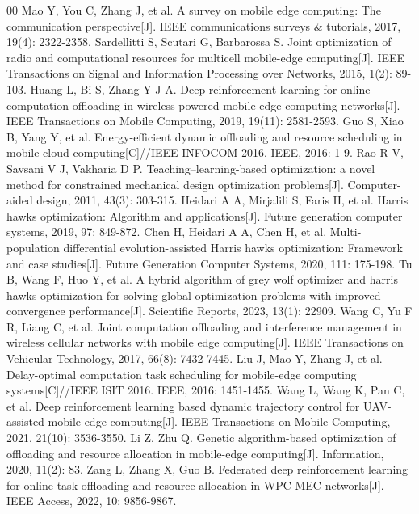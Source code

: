 \documentclass[conference]{IEEEtran}
\begin{document}
\begin{thebibliography}{00}
 Mao Y, You C, Zhang J, et al. A survey on mobile edge computing: The communication perspective[J]. IEEE communications surveys \& tutorials, 2017, 19(4): 2322-2358.
 Sardellitti S, Scutari G, Barbarossa S. Joint optimization of radio and computational resources for multicell mobile-edge computing[J]. IEEE Transactions on Signal and Information Processing over Networks, 2015, 1(2): 89-103.
 Huang L, Bi S, Zhang Y J A. Deep reinforcement learning for online computation offloading in wireless powered mobile-edge computing networks[J]. IEEE Transactions on Mobile Computing, 2019, 19(11): 2581-2593.
 Guo S, Xiao B, Yang Y, et al. Energy-efficient dynamic offloading and resource scheduling in mobile cloud computing[C]//IEEE INFOCOM 2016. IEEE, 2016: 1-9.
 Rao R V, Savsani V J, Vakharia D P. Teaching–learning-based optimization: a novel method for constrained mechanical design optimization problems[J]. Computer-aided design, 2011, 43(3): 303-315.
 Heidari A A, Mirjalili S, Faris H, et al. Harris hawks optimization: Algorithm and applications[J]. Future generation computer systems, 2019, 97: 849-872.
 Chen H, Heidari A A, Chen H, et al. Multi-population differential evolution-assisted Harris hawks optimization: Framework and case studies[J]. Future Generation Computer Systems, 2020, 111: 175-198.
 Tu B, Wang F, Huo Y, et al. A hybrid algorithm of grey wolf optimizer and harris hawks optimization for solving global optimization problems with improved convergence performance[J]. Scientific Reports, 2023, 13(1): 22909.
 Wang C, Yu F R, Liang C, et al. Joint computation offloading and interference management in wireless cellular networks with mobile edge computing[J]. IEEE Transactions on Vehicular Technology, 2017, 66(8): 7432-7445.
 Liu J, Mao Y, Zhang J, et al. Delay-optimal computation task scheduling for mobile-edge computing systems[C]//IEEE ISIT 2016. IEEE, 2016: 1451-1455.
 Wang L, Wang K, Pan C, et al. Deep reinforcement learning based dynamic trajectory control for UAV-assisted mobile edge computing[J]. IEEE Transactions on Mobile Computing, 2021, 21(10): 3536-3550.
 Li Z, Zhu Q. Genetic algorithm-based optimization of offloading and resource allocation in mobile-edge computing[J]. Information, 2020, 11(2): 83.
 Zang L, Zhang X, Guo B. Federated deep reinforcement learning for online task offloading and resource allocation in WPC-MEC networks[J]. IEEE Access, 2022, 10: 9856-9867.

\end{thebibliography}
\end{document}
